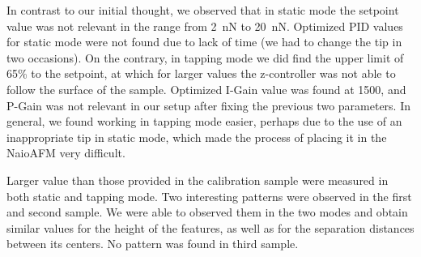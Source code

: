 \documentclass[11pt,a4paper]{article}
\begin{document}
In contrast to our initial thought, we observed that in static mode the setpoint value was not relevant in the range from \SI{2}{\nano\N} to \SI{20}{\nano\N}. Optimized PID values for static mode were not found due to lack of time (we had to change the tip in two occasions). On the contrary, in tapping mode we did find the upper limit of 65\% to the setpoint, at which for larger values the z-controller was not able to follow the surface of the sample. Optimized I-Gain value was found at 1500, and P-Gain was not relevant in our setup after fixing the previous two parameters. In general, we found working in tapping mode easier, perhaps due to the use of an inappropriate tip in static mode, which made the process of placing it in the NaioAFM very difficult.

Larger value than those provided in the calibration sample were measured in both static and tapping mode. Two interesting patterns were observed in the first and second sample. We were able to observed them in the two modes and obtain similar values for the height of the features, as well as for the separation distances between its centers. No pattern was found in third sample.

\nocite{*}
\vfill


\end{document}
